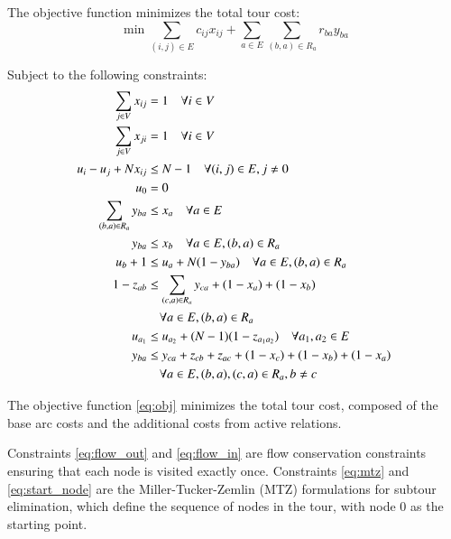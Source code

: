 \documentclass[twocolumn, switch]{article} %
\begin{document}
\footnotesize

The objective function minimizes the total tour cost:
\begin{equation} \label{eq:obj}
\min \sum_{(i,j) \in E} c_{ij} x_{ij} + \sum_{a \in E} \sum_{(b,a) \in R_a} r_{ba} y_{ba}
\end{equation}

Subject to the following constraints:
\begin{subequations}
\begin{align}
    \sum_{j \in V} x_{ij} &= 1 \quad \forall i \in V \label{eq:flow_out} \\
    \sum_{j \in V} x_{ji} &= 1 \quad \forall i \in V \label{eq:flow_in} \\
    u_i - u_j + N x_{ij} &\leq N-1 \quad \forall (i,j) \in E, j \neq 0 \label{eq:mtz} \\
    u_0 &= 0 \label{eq:start_node} \\
    \sum_{(b,a) \in R_a} y_{ba} &\leq x_a \quad \forall a \in E \label{eq:rel_active_1} \\
    y_{ba} &\leq x_b \quad \forall a \in E, (b,a) \in R_a \label{eq:rel_active_2} \\
    u_b + 1 &\leq u_a + N(1-y_{ba}) \quad \forall a \in E, (b,a) \in R_a \label{eq:rel_precedence} \\
    1 - z_{ab} &\leq \sum_{(c,a) \in R_a} y_{ca} + (1 - x_a) + (1 - x_b) \notag \\
    &\quad \forall a \in E, (b,a) \in R_a \label{eq:rel_active_3} \\
    u_{a_1} &\leq u_{a_2} + (N-1)(1-z_{a_1a_2}) \quad \forall a_1, a_2 \in E \label{eq:z_precedence} \\
    y_{ba} &\leq y_{ca} + z_{cb} + z_{ac} + (1-x_c) + (1-x_b) + (1-x_a) \notag \\
    &\quad \forall a \in E, (b,a),(c,a) \in R_a, b \neq c \label{eq:rel_last_trigger}
\end{align}
\end{subequations}

\normalsize

The objective function \eqref{eq:obj} minimizes the total tour cost, composed of the base arc costs and the additional costs from active relations.

Constraints \eqref{eq:flow_out} and \eqref{eq:flow_in} are flow conservation constraints ensuring that each node is visited exactly once.
Constraints \eqref{eq:mtz} and \eqref{eq:start_node} are the Miller-Tucker-Zemlin (MTZ) formulations for subtour elimination, which define the sequence of nodes in the tour, with node 0 as the starting point.
\end{document}
